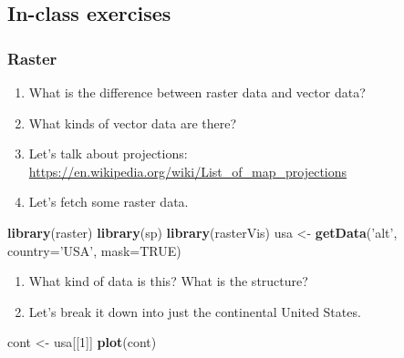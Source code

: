 \documentclass[
]{book}
\newenvironment{Shaded}{\begin{snugshade}}{\end{snugshade}}
\newcommand{\DataTypeTok}[1]{\textcolor[rgb]{0.13,0.29,0.53}{#1}}
\newcommand{\DecValTok}[1]{\textcolor[rgb]{0.00,0.00,0.81}{#1}}
\newcommand{\KeywordTok}[1]{\textcolor[rgb]{0.13,0.29,0.53}{\textbf{#1}}}
\newcommand{\NormalTok}[1]{#1}
\newcommand{\OtherTok}[1]{\textcolor[rgb]{0.56,0.35,0.01}{#1}}
\newcommand{\StringTok}[1]{\textcolor[rgb]{0.31,0.60,0.02}{#1}}
\begin{document}
\hypertarget{in-class-exercises}{%
\subsection*{In-class exercises}\label{in-class-exercises}}

\hypertarget{raster}{%
\subsubsection*{Raster}\label{raster}}

\begin{enumerate}
\def\labelenumi{\arabic{enumi}.}
\item
  What is the difference between raster data and vector data?
\item
  What kinds of vector data are there?
\item
  Let's talk about projections: \url{https://en.wikipedia.org/wiki/List_of_map_projections}
\item
  Let's fetch some raster data.
\end{enumerate}

\begin{Shaded}
\begin{Highlighting}[]
\KeywordTok{library}\NormalTok{(raster)}
\KeywordTok{library}\NormalTok{(sp)}
\KeywordTok{library}\NormalTok{(rasterVis)}
\NormalTok{usa <-}\StringTok{ }\KeywordTok{getData}\NormalTok{(}\StringTok{'alt'}\NormalTok{, }\DataTypeTok{country=}\StringTok{'USA'}\NormalTok{, }\DataTypeTok{mask=}\OtherTok{TRUE}\NormalTok{)}
\end{Highlighting}
\end{Shaded}

\begin{enumerate}
\def\labelenumi{\arabic{enumi}.}
\setcounter{enumi}{4}
\item
  What kind of data is this? What is the structure?
\item
  Let's break it down into just the continental United States.
\end{enumerate}

\begin{Shaded}
\begin{Highlighting}[]
\NormalTok{cont <-}\StringTok{ }\NormalTok{usa[[}\DecValTok{1}\NormalTok{]]}
\KeywordTok{plot}\NormalTok{(cont)}
\end{Highlighting}
\end{Shaded}
\end{document}
